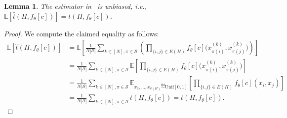 \documentclass{article}
\theoremstyle{plain}
\newtheorem{lemma}{Lemma}[section]
\theoremstyle{definition}
\theoremstyle{remark}
\begin{document}
\begin{lemma} \label{lem:unbiased}
The estimator in~ is unbiased, i.e., $\mathbb{E}[\widehat{t}(H,f_\theta[c])] = t(H,f_\theta[c])$.
\end{lemma}
\begin{proof}[Proof]
We compute the claimed equality as follows:
\begin{align*}
\mathbb{E}\left[\widehat{t}(H, f_\theta{[c]})\right] 
& {} = 
\mathbb{E}\left[\frac{1}{N|\mathcal{S}|} \sum_{k \in [N], \pi \in \mathcal{S}} \left(\prod_{\{i, j\} \in E(H)} f_\theta[c]\Big(x_{\pi(i)}^{(k)}, x_{\pi(j)}^{(k)}\Big)\right)\right]
\\
& {} = 
\frac{1}{N|\mathcal{S}|} \sum_{k \in [N], \pi \in \mathcal{S}} 
\mathbb{E}\left[\prod_{\{i, j\} \in E(H)} f_\theta[c]\Big(x_{\pi(i)}^{(k)}, x_{\pi(j)}^{(k)}\Big)\right]
\\
& {} = 
\frac{1}{N|\mathcal{S}|} \sum_{k \in [N], \pi \in \mathcal{S}} 
\mathbb{E}_{x_1,\ldots,x_{v(H)} \stackrel{\mathrm{iid}}{\sim}\mathrm{Unif}[0,1]}\left[\prod_{\{i, j\} \in E(H)} f_\theta[c](x_i, x_j)\right]
\\
& {} = 
\frac{1}{N{|\mathcal{S}|}} 
\sum_{k \in [N], \pi \in \mathcal{S}} t(H,f_\theta{[c]}) = t(H,f_\theta{[c]}).
\end{align*}
\end{proof}
\end{document}
